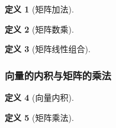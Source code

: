 \documentclass{ctexart}
\newtheorem{definition}{定义}[subsection]
\begin{document}
\begin{definition}[矩阵加法]
    
\end{definition}
\begin{definition}[矩阵数乘]
    
\end{definition}
\begin{definition}[矩阵线性组合]
    
\end{definition}

\subsubsection{向量的内积与矩阵的乘法}

\begin{definition}[向量内积]
    
\end{definition}
\begin{definition}[矩阵乘法]
    
\end{definition}
\end{document}
